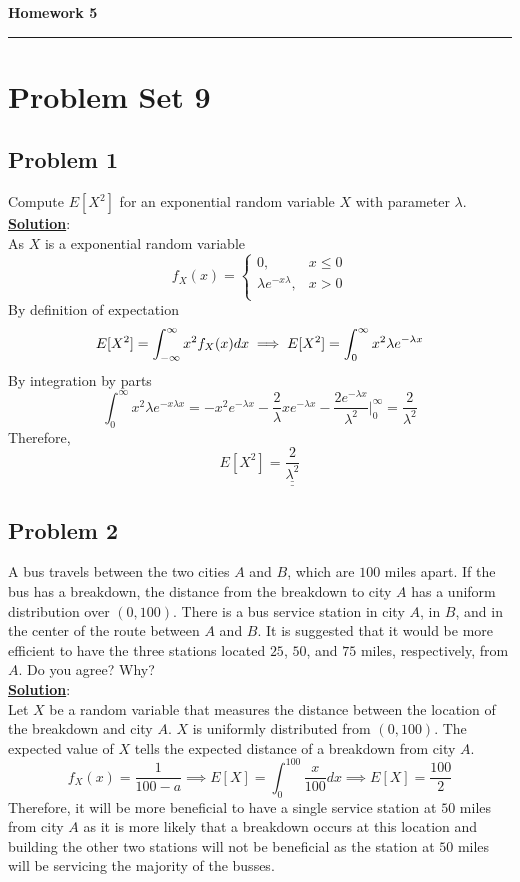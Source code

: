 \documentclass[11pt,letter paper]{report}
\begin{document}

\begin{center}
{\bf \Large Homework 5} 
\vspace{0.2cm}
\hrule
\end{center}

%
\section*{Problem Set 9}

\subsection*{Problem 1}
Compute $E[X^2]$ for an exponential random variable $X$ with parameter $\lambda$. \\[0.1cm]
{\bf \underline{Solution}}:\\
As $X$ is a exponential random variable $$f_X(x)=\begin{cases}0, & x\le0\\
\lambda e^{-x\lambda}, & x>0\\
\end{cases}$$
By definition of expectation
$$E[X^2]=\int_{-\infty}^{\infty}x^2f_X(x)dx\\
\implies E[X^2]=\int_{0}^{\infty}x^2\lambda e^{-\lambda x}$$
By integration by parts
$$\int_{0}^{\infty}x^2\lambda e^{-x\lambda x}=-x^2e^{-\lambda x}-\frac{2}{\lambda}xe^{-\lambda x}-\frac{2e^{-\lambda x}}{\lambda^2}\bigg|_0^{\infty}=\frac{2}{\lambda^2}$$
Therefore, $$E[X^2]=\underline{\underline{\frac{2}{\lambda^2}}}$$

\subsection*{Problem 2}
A bus travels between the two cities $A$ and $B$, which are $100$ miles apart. If the bus has a breakdown, the distance from the breakdown to city $A$ has a uniform distribution over $(0,100)$. There is a bus service station in city $A$, in $B$, and in the center of the route between $A$ and $B$. It is suggested that it would be more efficient to have the three stations located $25$, $50$, and $75$ miles, respectively, from $A$. Do you agree? Why? \\[0.1cm]
{\bf \underline{Solution}}:\\
Let $X$ be a random variable that measures the distance between the location of the breakdown and city $A$. $X$ is uniformly distributed from $(0,100)$. The expected value of $X$ tells the expected distance of a breakdown from city $A$. 
$$f_X(x)=\frac{1}{100-a}\implies E[X]=\int_0^100\frac{x}{100}dx\implies E[X]=\frac{100}{2}$$
Therefore, it will be more beneficial to have a single service station at $50$ miles from city $A$ as it is more likely that a breakdown occurs at this location and building the other two stations will not be beneficial as the station at $50$ miles will be servicing the majority of the busses. 
\end{document}
